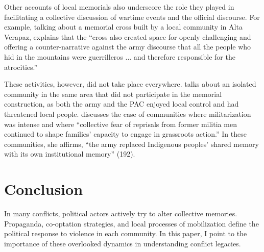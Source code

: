 \documentclass[12pt, notitlepage]{article}
\begin{document}
Other accounts of local memorials also underscore the role they played in facilitating a collective discussion of wartime events and the official discourse.
For example, talking about a memorial cross built by a local community in Alta Verapaz, \citet[170--171]{Viaene:2011td} explains that the ``cross also created space for openly challenging and offering a counter-narrative against the army discourse that all the people who hid in the mountains were guerrilleros ... and therefore responsible for the atrocities.''

These activities, however, did not take place everywhere.
\citet{Viaene:2011td} talks about an isolated community in the same area that did not participate in the memorial construction, as both the army and the PAC enjoyed local control and had threatened local people.
\citep[178]{Esparza:2018uw} discusses the case of communities where militarization was intense and where ``collective fear of reprisals from former militia men continued to shape families' capacity to engage in grassroots action.'' In these communities, she affirms, ``the army replaced Indigenous peoples' shared memory with its own institutional memory'' (192).


\section*{Conclusion}

In many conflicts, political actors actively try to alter collective memories.
Propaganda, co-optation strategies, and local processes of mobilization define the political response to violence in each community.
In this paper, I point to the importance of these overlooked dynamics in understanding conflict legacies.
\end{document}
